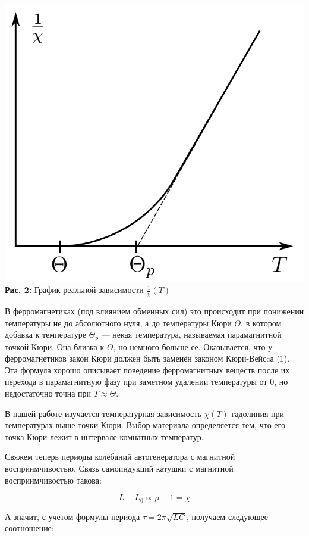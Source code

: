 \documentclass[12pt,a4paper]{scrartcl}
\begin{document}
	\begin{center}
		\includegraphics[scale=0.2]{PIC_2.png}
		\\\textbf{Рис. 2:} График реальной зависимости $\frac{1}{\chi}(T)$
	\end{center}
	
	В ферромагнетиках (под влиянием обменных
	сил) это происходит при понижении температуры не до	абсолютного нуля, а до температуры Кюри $\Theta$, в котором добавка к температуре $\Theta_p$ — некая температура, называемая парамагнитной точкой Кюри. Она близка к $\Theta$, но немного больше ее. Оказывается, что у ферромагнетиков закон Кюри должен быть заменён	законом Кюри-Вейсcа (1). Эта формула хорошо описывает поведение ферромагнитных веществ после их перехода в парамагнитную фазу при заметном удалении	температуры от 0, но недостаточно точна при $T \approx \Theta$.
	
	В нашей работе изучается температурная зависимость $\chi(T)$ гадолиния при температурах выше точки Кюри. Выбор материала определяется тем, что его точка Кюри лежит в интервале комнатных температур.
	
	
	Свяжем теперь периоды колебаний автогенератора с магнитной восприимчивостью. Связь самоиндукций катушки с магнитной восприимчивостью такова:
	
	$$L - L_0 \propto \mu - 1 = \chi$$
	
	А значит, с учетом формулы периода $\tau = 2\pi \sqrt{LC}$, получаем следующее соотношение:
	
\end{document}
